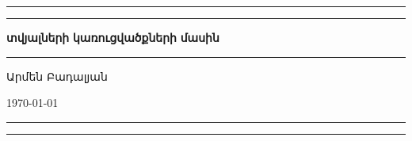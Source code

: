 
\begin{titlepage}
\begingroup
\newlength\drop{}\textheight

\setlength{\parindent}{0pt}

\rule{\textwidth}{1pt}\par
\vspace{2pt}\vspace{-\baselineskip}
\rule{\textwidth}{0.4pt}\par

\vspace\drop
\centering

{}
\null\vskip12pt\null
{\fontsize{28}{28}\selectfont\textbf{տվյալների}}
\null\vskip2pt\null
{\fontsize{28}{28}\selectfont\textbf{կառուցվածքների}}
\null\vskip8pt\null
{\fontsize{24}{24}\selectfont\textbf{մասին}}

\vspace{0.25\drop}
\rule{0.3\textwidth}{0.4pt}\par
\vspace{\drop}

{\LARGE Արմեն Բադալյան}\par

\vfill

{\large\today}

\rule{\textwidth}{0.4pt}\par
\vspace{2pt}\vspace{-\baselineskip}
\rule{\textwidth}{1pt}\par

\endgroup

\end{titlepage}

\begin{titlepage}
\null
\end{titlepage}
